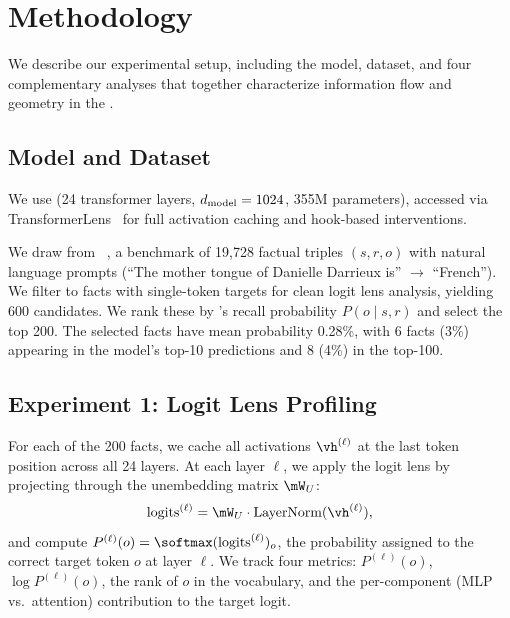 \section{Methodology}
\label{sec:methodology}

We describe our experimental setup, including the model, dataset, and four complementary analyses that together characterize information flow and geometry in the \residstream.

\subsection{Model and Dataset}
\label{sec:model_data}

 We use \gptmed (24 transformer layers, $d_{\text{model}} = 1024$, 355M parameters), accessed via TransformerLens~\citep{nanda2022transformerlens} for full activation caching and hook-based interventions.

 We draw from \counterfact~\citep{meng2022locating}, a benchmark of 19,728 factual triples $(s, r, o)$ with natural language prompts (\eg ``The mother tongue of Danielle Darrieux is'' $\to$ ``French''). We filter to facts with single-token targets for clean logit lens analysis, yielding 600 candidates. We rank these by \gptmed's recall probability $P(o \mid s, r)$ and select the top 200. The selected facts have mean probability 0.28\%, with 6 facts (3\%) appearing in the model's top-10 predictions and 8 (4\%) in the top-100.

\subsection{Experiment 1: Logit Lens Profiling}
\label{sec:exp1}

For each of the 200 facts, we cache all \residstream activations $\vh^{(\ell)}$ at the last token position across all 24 layers. At each layer $\ell$, we apply the logit lens by projecting through the unembedding matrix $\mW_U$:
\begin{equation}
    \text{logits}^{(\ell)} = \mW_U \cdot \text{LayerNorm}(\vh^{(\ell)}),
    \label{eq:logit_lens}
\end{equation}
and compute $P^{(\ell)}(o) = \softmax(\text{logits}^{(\ell)})_o$, the probability assigned to the correct target token $o$ at layer $\ell$. We track four metrics: $P^{(\ell)}(o)$, $\log P^{(\ell)}(o)$, the rank of $o$ in the vocabulary, and the per-component (MLP vs.\ attention) contribution to the target logit.

